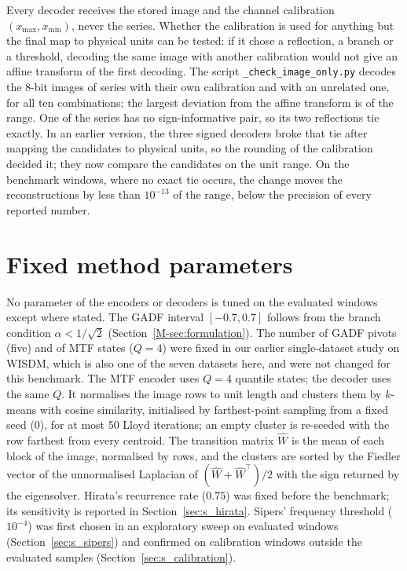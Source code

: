 \documentclass[preprint,12pt]{elsarticle}
\begin{document}
Every decoder receives the stored image and the channel calibration $(x_{\max},x_{\min})$, never the series. Whether the calibration is used for anything but the final map to physical units can be tested: if it chose a reflection, a branch or a threshold, decoding the same image with another calibration would not give an affine transform of the first decoding. The script \texttt{\_check\_image\_only.py} decodes the 8-bit images of \imgOnlySeries{} series with their own calibration and with an unrelated one, for all ten combinations; the largest deviation from the affine transform is \imgOnlyMax{} of the range. One of the series has no sign-informative pair, so its two reflections tie exactly. In an earlier version, the three signed decoders broke that tie after mapping the candidates to physical units, so the rounding of the calibration decided it; they now compare the candidates on the unit range. On the benchmark windows, where no exact tie occurs, the change moves the reconstructions by less than $10^{-13}$ of the range, below the precision of every reported number.

\section{Fixed method parameters}\label{sec:s_params}
No parameter of the encoders or decoders is tuned on the evaluated windows except where stated. The GADF interval $[-0.7,0.7]$ follows from the branch condition $\alpha<1/\sqrt2$ (Section~\ref{M-sec:formulation}). The number of GADF pivots (five) and of MTF states ($Q=4$) were fixed in our earlier single-dataset study on WISDM, which is also one of the seven datasets here, and were not changed for this benchmark. The MTF encoder uses $Q=4$ quantile states; the decoder uses the same $Q$. It normalises the image rows to unit length and clusters them by $k$-means with cosine similarity, initialised by farthest-point sampling from a fixed seed (0), for at most 50 Lloyd iterations; an empty cluster is re-seeded with the row farthest from every centroid. The transition matrix $\hat W$ is the mean of each block of the image, normalised by rows, and the clusters are sorted by the Fiedler vector of the unnormalised Laplacian of $(\hat W+\hat W^\top)/2$ with the sign returned by the eigensolver. Hirata's recurrence rate ($0.75$) was fixed before the benchmark; its sensitivity is reported in Section~\ref{sec:s_hirata}. Sipers' frequency threshold ($10^{-4}$) was first chosen in an exploratory sweep on evaluated windows (Section~\ref{sec:s_sipers}) and confirmed on calibration windows outside the evaluated samples (Section~\ref{sec:s_calibration}).
\end{document}
